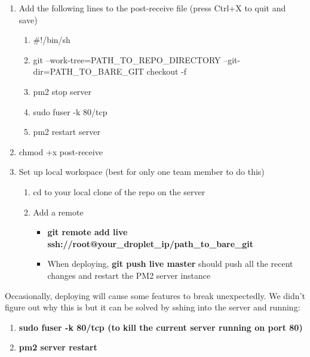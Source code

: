 \documentclass{article}
\begin{document}
\begin{flushleft}
\begin{enumerate}
\begin{enumerate}
\begin{enumerate}
      \item Add the following lines to the post-receive file (press Ctrl+X to quit and save)
      \begin{enumerate}
        \item \#!/bin/sh
        \item git --work-tree=PATH\_TO\_REPO\_DIRECTORY --git-dir=PATH\_TO\_BARE\_GIT checkout -f
        \item pm2 stop server
        \item sudo fuser -k 80/tcp
        \item pm2 restart server
      \end{enumerate}
      \item chmod +x post-receive
      \item Set up local workspace (best for only one team member to do this)
      \begin{enumerate}
        \item cd to your local clone of the repo on the server
        \item Add a remote
        \begin{itemize}
          \item \textbf{git remote add live ssh://root@your\_droplet\_ip/path\_to\_bare\_git}
          \item When deploying, \textbf{git push live master} should push all the recent changes and restart the PM2 server instance
        \end{itemize}
      \end{enumerate}
    \end{enumerate}
  \end{enumerate}
\end{enumerate}
\end{flushleft}
Occasionally, deploying will cause some features to break unexpectedly. We didn’t figure out why this is but it can be solved by sshing into the server and running:
\begin{enumerate}
  \item \textbf{sudo fuser -k 80/tcp (to kill the current server running on port 80)}
  \item \textbf{pm2 server restart}
\end{enumerate}
\end{document}
